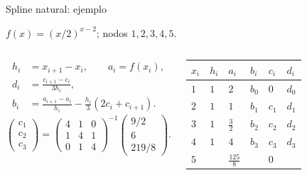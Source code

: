 \documentclass[main.tex]{subfiles}
\begin{document}
\begin{frame}[t]{Spline natural: ejemplo}
\par\noindent\begin{minipage}[t][9mm][t]{\textwidth}\small\strut $f(x)=(x/2)^{x-2}$; nodos $1,2,3,4,5$.\end{minipage}\par\nointerlineskip
\begin{columns}[T]\scriptsize\begin{align*}
h_i&=x_{i+1}-x_i,\qquad a_i=f(x_i),\\
d_i&=\frac{c_{i+1}-c_i}{3h_i},\\
b_i&=\frac{a_{i+1}-a_i}{h_i}-\frac{h_i}{3}(2c_i+c_{i+1}).
\end{align*}\scriptsize\[\begin{pmatrix}c_1\\c_2\\c_3\end{pmatrix}=\begin{pmatrix}4&1&0\\1&4&1\\0&1&4\end{pmatrix}^{-1}\begin{pmatrix}9/2\\6\\219/8\end{pmatrix}.\]\begin{minipage}[t]{\textwidth}\begingroup\scriptsize\setlength{\tabcolsep}{2pt}\begin{center}\begin{tabular}{|C{.12\textwidth}|C{.12\textwidth}|C{.12\textwidth}|C{.12\textwidth}|C{.12\textwidth}|C{.12\textwidth}|}\hline
\rule[-2mm]{0pt}{6mm}$x_i$&$h_i$&$a_i$&$b_i$&$c_i$&$d_i$\\\hline
\rule[-2.5mm]{0pt}{7mm}$1$&$1$&$2$&$b_0$&$0$&$d_0$\\\hline
\rule[-2.5mm]{0pt}{7mm}$2$&$1$&$1$&$b_1$&$c_1$&$d_1$\\\hline
\rule[-2.5mm]{0pt}{7mm}$3$&$1$&$\frac{3}{2}$&$b_2$&$c_2$&$d_2$\\\hline
\rule[-2.5mm]{0pt}{7mm}$4$&$1$&$4$&$b_3$&$c_3$&$d_3$\\\hline
\rule[-2.5mm]{0pt}{7mm}$5$&&$\frac{125}{8}$&&$0$&\\\hline
\end{tabular}\end{center}\endgroup\end{minipage}\par
\end{columns}
\end{frame}
\end{document}
